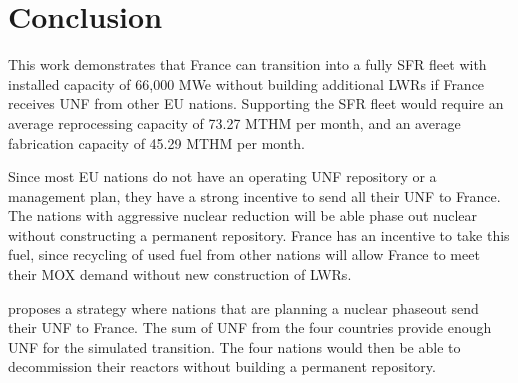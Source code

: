 \section{Conclusion}

This work demonstrates that France can transition into
a fully \gls{SFR} fleet with installed capacity of 66,000 MWe without
building additional \glspl{LWR}
if France receives \gls{UNF} from other \gls{EU} nations.
Supporting the \gls{SFR} fleet would require an average 
reprocessing capacity of 73.27 MTHM per month,
and an average fabrication capacity of 45.29 MTHM per month.


Since most \gls{EU} nations do not have an operating \gls{UNF}
repository or a management plan, they have a strong incentive
to send all their \gls{UNF} to France. The nations
with aggressive nuclear reduction will be able phase out nuclear
without constructing a permanent repository. France has an
incentive to take this fuel, since recycling of used fuel from
other nations will allow France to meet their MOX demand
without new construction of \glspl{LWR}.

 proposes a strategy where nations
that are planning a nuclear phaseout send their \gls{UNF}
to France. The sum of \gls{UNF} from the four countries
provide enough \gls{UNF} for the simulated transition.
The four nations would then be able to decommission
their reactors without building a permanent repository. 

